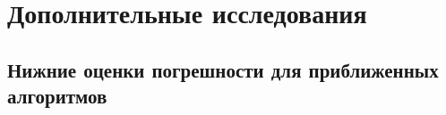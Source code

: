 
\section{Дополнительные исследования}
\subsection{Нижние оценки погрешности для приближенных алгоритмов}
